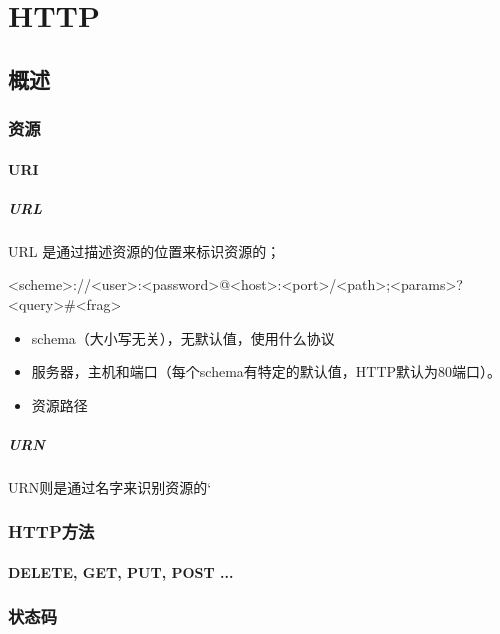\chapter{HTTP}

\section{概述}


\subsection{资源}


\subsubsection{URI}

\paragraph{URL}
URL 是通过描述资源的位置来标识资源的；


\begin{Bash}[格式]
<scheme>://<user>:<password>@<host>:<port>/<path>;<params>?<query>#<frag>
\end{Bash}

\begin{itemize}
\item schema（大小写无关），无默认值，使用什么协议
\item 服务器，主机和端口（每个schema有特定的默认值，HTTP默认为80端口）。
\item 资源路径
\end{itemize}



\paragraph{URN}
URN则是通过名字来识别资源的‘
\subsection{HTTP方法}

\subsubsection{DELETE, GET, PUT, POST ...}


\subsection{状态码}

